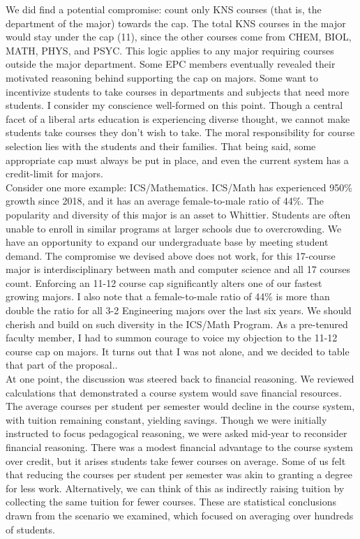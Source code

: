 \documentclass[../../../main.tex]{subfiles}
\begin{document}
We did find a potential compromise: count only KNS courses (that is, the department of the major) towards the cap.  The total KNS courses in the major would stay under the cap (11), since the other courses come from CHEM, BIOL, MATH, PHYS, and PSYC.  This logic applies to any major requiring courses outside the major department.  Some EPC members eventually revealed their motivated reasoning behind supporting the cap on majors.  Some want to incentivize students to take courses in departments and subjects that need more students.  I consider my conscience well-formed on this point.  Though a central facet of a liberal arts education is experiencing diverse thought, we cannot make students take courses they don't wish to take.  The moral responsibility for course selection lies with the students and their families.  That being said, some appropriate cap must always be put in place, and even the current system has a credit-limit for majors.
\\
\vspace{0.25cm}
Consider one more example: ICS/Mathematics.  ICS/Math has experienced 950\% growth since 2018, and it has an average female-to-male ratio of 44\%.  The popularity and diversity of this major is an asset to Whittier.  Students are often unable to enroll in similar programs at larger schools due to overcrowding.  We have an opportunity to expand our undergraduate base by meeting student demand.  The compromise we devised above does not work, for this 17-course major is interdisciplinary between math and computer science and all 17 courses count.  Enforcing an 11-12 course cap significantly alters one of our fastest growing majors.  I also note that a female-to-male ratio of 44\% is more than double the ratio for all 3-2 Engineering majors over the last six years.  We should cherish and build on such diversity in the ICS/Math Program.  As a pre-tenured faculty member, I had to summon courage to voice my objection to the 11-12 course cap on majors.  It turns out that I was not alone, and we decided to table that part of the proposal..
\\
\vspace{0.25cm}
At one point, the discussion was steered back to financial reasoning.  We reviewed calculations that demonstrated a course system would save financial resources.  The average courses per student per semester would decline in the course system, with tuition remaining constant, yielding savings.  Though we were initially instructed to focus pedagogical reasoning, we were asked mid-year to reconsider financial reasoning.  There was a modest financial advantage to the course system over credit, but it arises students take fewer courses on average.  Some of us felt that reducing the courses per student per semester was akin to granting a degree for less work.  Alternatively, we can think of this as indirectly raising tuition by collecting the same tuition for fewer courses.  These are statistical conclusions drawn from the scenario we examined, which focused on averaging over hundreds of students.
\end{document}
